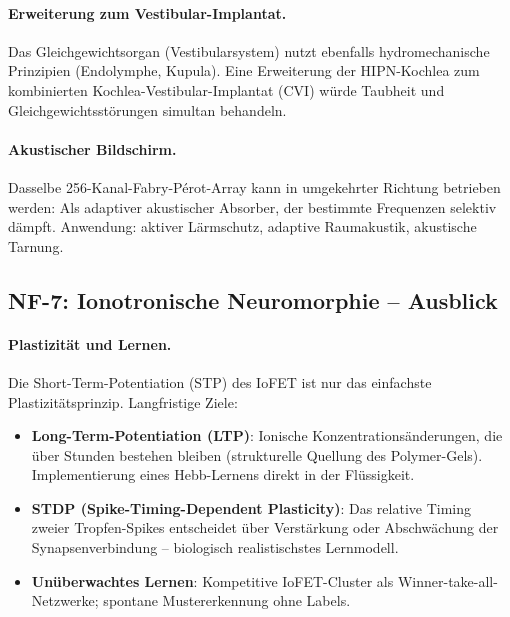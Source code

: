 ﻿\documentclass[a4paper,12pt]{scrreprt}
\theoremstyle{definition}
\begin{document}
\paragraph{Erweiterung zum Vestibular-Implantat.}
Das Gleichgewichtsorgan (Vestibularsystem) nutzt ebenfalls
hydromechanische Prinzipien (Endolymphe, Kupula). Eine
Erweiterung der HIPN-Kochlea zum kombinierten
Kochlea-Vestibular-Implantat (CVI) würde Taubheit und
Gleichgewichtsstörungen simultan behandeln.

\paragraph{Akustischer Bildschirm.}
Dasselbe 256-Kanal-Fabry-Pérot-Array kann in umgekehrter Richtung
betrieben werden: Als adaptiver akustischer Absorber, der bestimmte
Frequenzen selektiv dämpft. Anwendung: aktiver Lärmschutz,
adaptive Raumakustik, akustische Tarnung.

\subsection*{NF-7: Ionotronische Neuromorphie -- Ausblick}

\paragraph{Plastizität und Lernen.}
Die Short-Term-Potentiation (STP) des IoFET ist nur das einfachste
Plastizitätsprinzip. Langfristige Ziele:
\begin{itemize}
  \item \textbf{Long-Term-Potentiation (LTP)}: Ionische
    Konzentrationsänderungen, die über Stunden bestehen bleiben
    (strukturelle Quellung des Polymer-Gels). Implementierung
    eines Hebb-Lernens direkt in der Flüssigkeit.
  \item \textbf{STDP (Spike-Timing-Dependent Plasticity)}: Das
    relative Timing zweier Tropfen-Spikes entscheidet über
    Verstärkung oder Abschwächung der Synapsenverbindung --
    biologisch realistischstes Lernmodell.
  \item \textbf{Unüberwachtes Lernen}: Kompetitive IoFET-Cluster
    als Winner-take-all-Netzwerke; spontane Mustererkennung ohne
    Labels.
\end{itemize}
\end{document}

